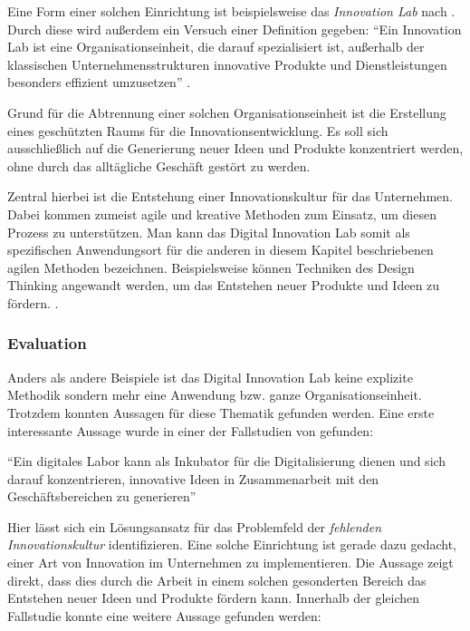 Eine Form einer solchen Einrichtung ist beispielsweise das \textit{Innovation Lab} nach . Durch diese wird außerdem ein Versuch einer Definition gegeben: ``Ein Innovation Lab ist eine Organisationseinheit, die darauf spezialisiert ist, außerhalb der klassischen Unternehmensstrukturen innovative Produkte und Dienstleistungen besonders effizient umzusetzen'' \cite{meyer_innovation_nodate}.

Grund für die Abtrennung einer solchen Organisationseinheit ist die Erstellung eines geschützten Raums für die Innovationsentwicklung. Es soll sich ausschließlich auf die Generierung neuer Ideen und Produkte konzentriert werden, ohne durch das alltägliche Geschäft gestört zu werden.

Zentral hierbei ist die Entstehung einer Innovationskultur für das Unternehmen. Dabei kommen zumeist agile und kreative Methoden zum Einsatz, um diesen Prozess zu unterstützen. Man kann das Digital Innovation Lab somit als spezifischen Anwendungsort für die anderen in diesem Kapitel beschriebenen agilen Methoden bezeichnen. Beispielsweise  können Techniken des Design Thinking angewandt werden, um das Entstehen neuer Produkte und Ideen zu fördern. \cite{meyer_innovation_nodate}.


\subsubsection{Evaluation}

Anders als andere Beispiele ist das Digital Innovation Lab keine explizite Methodik sondern mehr eine Anwendung bzw. ganze Organisationseinheit. Trotzdem konnten Aussagen für diese Thematik gefunden werden. Eine erste interessante Aussage wurde in einer der Fallstudien von  gefunden:

\begin{center}
	``Ein digitales Labor kann als Inkubator für die Digitalisierung dienen und sich darauf konzentrieren, innovative Ideen in Zusammenarbeit mit den Geschäftsbereichen zu generieren'' \cite[S. 266]{urbach_digitalization_2018}
\end{center}

Hier lässt sich ein Lösungsansatz für das Problemfeld der \textit{fehlenden Innovationskultur} identifizieren. Eine solche Einrichtung ist gerade dazu gedacht, einer Art von Innovation im Unternehmen zu  implementieren. Die Aussage zeigt direkt, dass dies durch die Arbeit in einem solchen gesonderten Bereich das Entstehen neuer Ideen und Produkte fördern kann. Innerhalb der gleichen Fallstudie konnte eine weitere Aussage gefunden werden:


